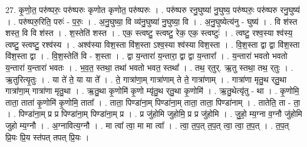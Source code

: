 \documentclass[17pt]{extarticle}
\begin{document}
27. कृ॒णो॒त॒ परु॑ष्परुः॒ परु॑ष्परुः कृणोत कृणोत॒ परु॑ष्परुः । . परु॑ष्परु रनु॒घुष्या॑ नु॒घुष्य॒ परु॑ष्परुः॒ परु॑ष्परु रनु॒घुष्य॑ । . परु॑ष्परु॒रिति॒ परुः॑ - प॒रुः॒ । . अ॒नु॒घुष्या॒ वि व्य॑नु॒घुष्या॑ नु॒घुष्या॒ वि । . अ॒नु॒घुष्येत्य॑नु - घुष्य॑ । . वि श॑स्त शस्त॒ वि वि श॑स्त । . श॒स्तेति॑ शस्त । . एक॒ स्त्वष्टु॒ स्त्वष्टु॒ रेक॒ एक॒ स्त्वष्टुः॑ । . त्वष्टु॒ रश्व॒स्या श्व॑स्य॒ त्वष्टु॒ स्त्वष्टु॒ रश्व॑स्य । . अश्व॑स्या विश॒स्ता वि॑श॒स्ता ऽश्व॒स्या श्व॑स्या विश॒स्ता । . वि॒श॒स्ता द्वा द्वा वि॑श॒स्ता वि॑श॒स्ता द्वा । . वि॒श॒स्तेति॑ वि - श॒स्ता । . द्वा य॒न्तारा॑ य॒न्तारा॒ द्वा द्वा य॒न्तारा᳚ । . य॒न्तारा॑ भवतो भवतो य॒न्तारा॑ य॒न्तारा॑ भवतः । . भ॒व॒त॒ स्तथा॒ तथा॑ भवतो भवत॒ स्तथा᳚ । . तथ॒ र्‌तुर्. ऋ॒तु स्तथा॒ तथ॒ र्‌तुः । . ऋ॒तुरित्यृ॒तुः । . या ते॑ ते॒ या या ते᳚ । . ते॒ गात्रा॑णा॒म् गात्रा॑णाम् ते ते॒ गात्रा॑णाम् । . गात्रा॑णा मृतु॒थ र्‌तु॒था गात्रा॑णा॒म् गात्रा॑णा मृतु॒था । . ऋ॒तु॒था कृ॒णोमि॑ कृ॒णो म्यृ॑तु॒थ र्‌तु॒था कृ॒णोमि॑ । . ऋ॒तु॒थेत्यृ॑तु - था । . कृ॒णोमि॒ ताता॒ ताता॑ कृ॒णोमि॑ कृ॒णोमि॒ ताता᳚ । . ताता॒ पिण्डा॑ना॒म् पिण्डा॑ना॒म् ताता॒ ताता॒ पिण्डा॑नाम् । . तातेति॒ ता - ता॒ । . पिण्डा॑ना॒म् प्र प्र पिण्डा॑ना॒म् पिण्डा॑ना॒म् प्र । . प्र जु॑होमि जुहोमि॒ प्र प्र जु॑होमि । . जु॒हो॒ म्य॒ग्ना व॒ग्नौ जु॑होमि जुहो म्य॒ग्नौ । . अ॒ग्नावित्य॒ग्नौ । . मा त्वा᳚ त्वा॒ मा मा त्वा᳚ । . त्वा॒ त॒प॒त् त॒प॒त् त्वा॒ त्वा॒ त॒प॒त् । . त॒प॒त् प्रि॒यः प्रि॒य स्त॑पत् तपत् प्रि॒यः । \newline
\end{document}

